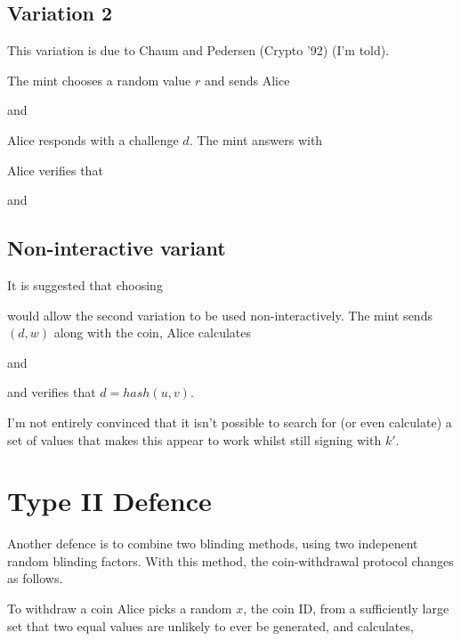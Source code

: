 \documentclass[a4paper,titlepage]{article}
\begin{document}
\subsection{Variation 2}

This variation is due to Chaum and Pedersen (Crypto '92) (I'm told).

The mint chooses a random value $r$ and sends Alice


and


Alice responds with a challenge $d$. The mint answers with


Alice verifies that


and


\subsection{Non-interactive variant}

It is suggested that choosing


would allow the second variation to be used non-interactively. The
mint sends $(d,w)$ along with the coin, Alice calculates


and


and verifies that $d=hash(u,v)$.

I'm not entirely convinced that it isn't possible to search for (or
even calculate) a set of values that makes this appear to work whilst
still signing with $k'$.

\section{Type II Defence}

Another defence is to combine two blinding methods, using two
indepenent random blinding factors. With this method, the
coin-withdrawal protocol changes as follows.

To withdraw a coin Alice picks a random $x$, the coin ID, from a
sufficiently large set that two equal values are unlikely to ever be
generated, and calculates,
\end{document}
